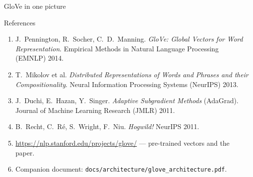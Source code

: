 \documentclass[aspectratio=169,11pt]{beamer}
\newcommand{\wv}{\mathbf{w}}
\newcommand{\cv}{\tilde{\mathbf{w}}}
\newcommand{\file}[1]{\texttt{#1}}
\begin{document}
\begin{frame}{GloVe in one picture}
\centering
{}
\end{frame}

\begin{frame}{References}
\small
\begin{enumerate}
  \item J.~Pennington, R.~Socher, C.~D.~Manning. \emph{GloVe: Global Vectors for Word Representation}. Empirical Methods in Natural Language Processing (EMNLP) 2014.
  \item T.~Mikolov et al. \emph{Distributed Representations of Words and Phrases and their Compositionality}. Neural Information Processing Systems (NeurIPS) 2013.
  \item J.~Duchi, E.~Hazan, Y.~Singer. \emph{Adaptive Subgradient Methods} (AdaGrad). Journal of Machine Learning Research (JMLR) 2011.
  \item B.~Recht, C.~R\'e, S.~Wright, F.~Niu. \emph{Hogwild!} NeurIPS 2011.
  \item \url{https://nlp.stanford.edu/projects/glove/} --- pre-trained vectors and the paper.
  \item Companion document: \file{docs/architecture/glove\_architecture.pdf}.
\end{enumerate}
\end{frame}
\end{document}
